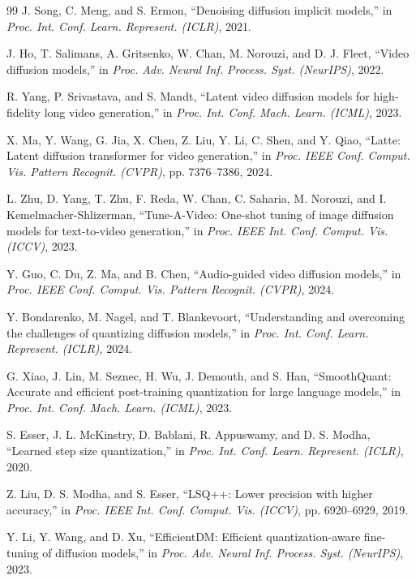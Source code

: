 \documentclass[journal,twoside]{IEEEtran}
\theoremstyle{definition}
\theoremstyle{remark}
\begin{document}
\begin{thebibliography}{99}
J. Song, C. Meng, and S. Ermon, ``Denoising diffusion implicit models,'' in \textit{Proc. Int. Conf. Learn. Represent. (ICLR)}, 2021.

J. Ho, T. Salimans, A. Gritsenko, W. Chan, M. Norouzi, and D. J. Fleet, ``Video diffusion models,'' in \textit{Proc. Adv. Neural Inf. Process. Syst. (NeurIPS)}, 2022.

R. Yang, P. Srivastava, and S. Mandt, ``Latent video diffusion models for high-fidelity long video generation,'' in \textit{Proc. Int. Conf. Mach. Learn. (ICML)}, 2023.

X. Ma, Y. Wang, G. Jia, X. Chen, Z. Liu, Y. Li, C. Shen, and Y. Qiao, ``{Latte}: Latent diffusion transformer for video generation,'' in \textit{Proc. IEEE Conf. Comput. Vis. Pattern Recognit. (CVPR)}, pp. 7376--7386, 2024.

L. Zhu, D. Yang, T. Zhu, F. Reda, W. Chan, C. Saharia, M. Norouzi, and I. Kemelmacher-Shlizerman, ``{Tune-A-Video}: One-shot tuning of image diffusion models for text-to-video generation,'' in \textit{Proc. IEEE Int. Conf. Comput. Vis. (ICCV)}, 2023.

Y. Guo, C. Du, Z. Ma, and B. Chen, ``Audio-guided video diffusion models,'' in \textit{Proc. IEEE Conf. Comput. Vis. Pattern Recognit. (CVPR)}, 2024.

Y. Bondarenko, M. Nagel, and T. Blankevoort, ``Understanding and overcoming the challenges of quantizing diffusion models,'' in \textit{Proc. Int. Conf. Learn. Represent. (ICLR)}, 2024.

G. Xiao, J. Lin, M. Seznec, H. Wu, J. Demouth, and S. Han, ``SmoothQuant: Accurate and efficient post-training quantization for large language models,'' in \textit{Proc. Int. Conf. Mach. Learn. (ICML)}, 2023.

S. Esser, J. L. McKinstry, D. Bablani, R. Appuswamy, and D. S. Modha, ``Learned step size quantization,'' in \textit{Proc. Int. Conf. Learn. Represent. (ICLR)}, 2020.

Z. Liu, D. S. Modha, and S. Esser, ``{LSQ++}: Lower precision with higher accuracy,'' in \textit{Proc. IEEE Int. Conf. Comput. Vis. (ICCV)}, pp. 6920--6929, 2019.

Y. Li, Y. Wang, and D. Xu, ``EfficientDM: Efficient quantization-aware fine-tuning of diffusion models,'' in \textit{Proc. Adv. Neural Inf. Process. Syst. (NeurIPS)}, 2023.


\end{thebibliography}
\end{document}
